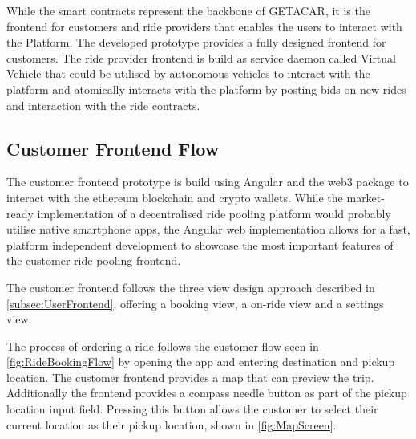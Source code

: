 While the smart contracts represent the backbone of GETACAR, it is the frontend for customers and ride providers that enables the users to interact with the Platform. The developed prototype provides a fully designed frontend  for customers. The ride provider frontend is build as service daemon called Virtual Vehicle that could be utilised by autonomous vehicles to interact with the platform and atomically interacts with the platform by posting bids on new rides and interaction with the ride contracts. 

\subsection{Customer Frontend Flow}
The customer frontend prototype is build using Angular and the web3 package to interact with the ethereum blockchain and crypto wallets. While the market-ready implementation of a decentralised ride pooling platform would probably utilise native smartphone apps, the Angular web implementation allows for a fast, platform independent development to showcase the most important features of the customer ride pooling frontend. 

The customer frontend follows the three view design approach described in \ref{subsec:UserFrontend}, offering a booking view, a on-ride view and a settings view. 

The process of ordering a ride follows the customer flow seen in \ref{fig:RideBookingFlow} by opening the app and entering destination and pickup location. The customer frontend provides a map that can preview the trip. Additionally the frontend provides  a compass needle button as part of the pickup location input field. Pressing this button allows the customer to select their current location as their pickup location, shown in \ref{fig:MapScreen}.

